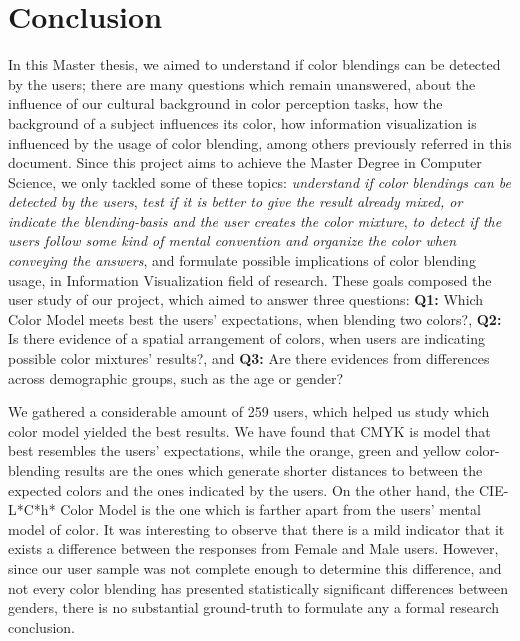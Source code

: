 
\chapter{Conclusion}
\label{chapter:conclusion}
%
In this Master thesis, we aimed to understand if color blendings can be detected by the users; there are many questions which remain unanswered, about the influence
of our cultural background in color perception tasks, how the background of a subject influences its color, how information visualization is influenced
by the usage of color blending, among others previously referred in this document. Since this project aims to achieve the Master Degree in Computer
Science, we only tackled some of these topics: \emph{understand if color blendings can be detected by the users}, \emph{test if it is better to give
the result already mixed, or indicate the blending-basis and the user creates the color mixture}, \emph{to detect if the users follow some kind of
mental convention and organize the color when conveying the answers}, and formulate possible implications of color blending usage, in Information
Visualization field of research.
These goals composed the user study of our project, which aimed to answer three questions: \textbf{Q1:} Which Color Model meets best the users'
expectations, when blending two colors?, \textbf{Q2:} Is there evidence of a spatial arrangement of colors, when users are indicating possible color
mixtures' results?, and \textbf{Q3:} Are there evidences from differences across demographic groups, such as the age or gender? \par
%
We gathered a considerable amount of 259 users, which helped us study which color model yielded the best results. We have found that CMYK is model that
best resembles the users' expectations, while the orange, green and yellow color-blending results are the ones which generate shorter distances to
between the expected colors and the ones indicated by the users. On the other hand, the CIE-L*C*h* Color Model is the one which is farther apart
from the users' mental model of color.
It was interesting to observe that there is a mild indicator that it exists a difference between the responses from Female and Male users. However,
since our user sample was not complete enough to determine this difference, and not every color blending has presented statistically significant
differences between genders, there is no substantial ground-truth to formulate any a formal research conclusion. \par
